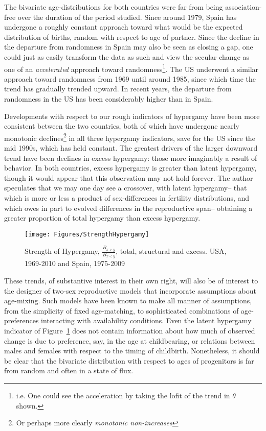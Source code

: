 The bivariate age-distributions for both countries were far from being
association-free over the duration of the period studied. Since around
1979, Spain has undergone a roughly constant approach toward what would be the
expected distribution of births, random with respect to age of
partner. Since the decline in the departure from randomness in Spain 
may also be seen as closing a gap, one could just as
easily transform the data as such and view the secular change as one of an
\textit{accelerated} approach toward randomness\footnote{i.e. One could see the
acceleration by taking the lofit of the trend in $\theta$ shown.}. The US
underwent a similar approach toward randomness from 1969 until around 1985,
since which time the trend has gradually trended upward. In recent years, the
departure from randomness in the US has been considerably higher than in Spain.

Developments with respect to our rough indicators of hypergamy have been more
consistent between the two countries, both of which have undergone nearly
monotonic declines\footnote{Or perhaps more clearly \textit{monotonic
non-increases}} in all three hypergamy indicators, save for the US since the mid
1990s, which has held constant. The greatest drivers of the larger downward trend
have been declines in excess hypergamy: those more imaginably a result of
behavior. In both countries, excess hypergamy is greater than latent hypergamy,
though it would appear that this observation may not hold forever. The author
 speculates that we may one day see a crossover, with latent hypergamy-- that
which is more or less a product of sex-differences in fertility distributions,
and which owes in part to evolved differences in the reproductive span-- obtaining a
greater proportion of total hypergamy than excess hypergamy.

\begin{figure}[!ht]
  \centering
    \caption{Strength of Hypergamy, $\frac{B_{x>y}}{B_{x<y}}$, total, structural
    and excess. USA, 1969-2010 and Spain, 1975-2009}
    \texttt{[image: Figures/StrengthHypergamy]}      
    \label{fig:HypergamyStrength}
\end{figure}

These trends, of substantive interest in their own right, will also be of
interest to the designer of two-sex reproductive models that incorporate
 assumptions about age-mixing. Such models have been known to make all
 manner of assumptions, from the simplicity of fixed age-matching, to
 sophisticated combinations of age-preferences interacting with availability
 conditions. Even the latent hypergamy indicator of
 Figure~\ref{fig:HypergamyStrength} does not contain information about how much
 of observed change is due to preference, say, in the age at childbearing, or
 relations between males and females with respect to the timing of childbirth.
 Nonetheless, it should be clear that the bivariate distribution with respect to
 ages of progenitors is far from random and often in a state of flux.
